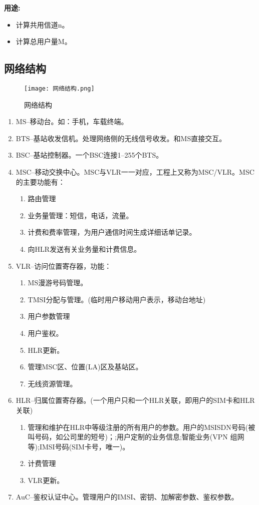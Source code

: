 	 \textbf{用途:}\\
	 \begin{itemize}
	 	\item 计算共用信道n。
	 	\item 计算总用户量M。
	 \end{itemize}
	\subsection{网络结构}
	\begin{figure}[H]
		\centering
		\texttt{[image: 网络结构.png]}
		\caption{网络结构}
	\end{figure}
	\begin{enumerate}
		\item MS--移动台。如：手机，车载终端。
		\item BTS--基站收发信机。处理网络侧的无线信号收发。和MS直接交互。
		\item BSC--基站控制器。一个BSC连接1--255个BTS。
		\item MSC--移动交换中心。MSC与VLR一一对应，工程上又称为MSC/VLR。MSC的主要功能有：
		\begin{enumerate}
			\item 路由管理
			\item 业务量管理：短信，电话，流量。
			\item 计费和费率管理，为用户通信时间生成详细话单记录。
			\item 向HLR发送有关业务量和计费信息。
		\end{enumerate}
		\item VLR--访问位置寄存器，功能：
		\begin{enumerate}
			\item MS漫游号码管理。
			\item TMSI分配与管理。(临时用户移动用户表示，移动台地址)
			\item 用户参数管理
			\item 用户鉴权。
			\item HLR更新。
			\item 管理MSC区、位置(LA)区及基站区。
			\item 无线资源管理。
		\end{enumerate}
		\item HLR--归属位置寄存器。(一个用户只和一个HLR关联，即用户的SIM卡和HLR关联)
		\begin{enumerate}
			\item 管理和维护在HLR中等级注册的所有用户的参数。用户的MSISDN号码(被叫号码，如公司里的短号)；;用户定制的业务信息;智能业务(VPN
			组网等);IMSI号码(SIM卡号，唯一)。
			\item 计费管理
			\item VLR更新。
		\end{enumerate}
		\item AuC--鉴权认证中心。管理用户的IMSI、密钥、加解密参数、鉴权参数。
	\end{enumerate}
